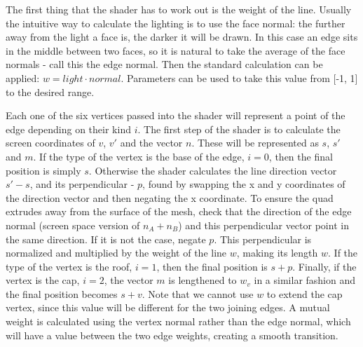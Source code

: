 \documentclass[a4paper, 12pt]{article}
\begin{document}
The first thing that the shader has to work out is the weight of the line. Usually the intuitive way to calculate the lighting is to use the face normal: the further away from the light a face is, the darker it will be drawn. In this case an edge sits in the middle between two faces, so it is natural to take the average of the face normals - call this the edge normal. Then the standard calculation can be applied: $w = light \cdot normal$. Parameters can be used to take this value from [-1, 1] to the desired range.

Each one of the six vertices passed into the shader will represent a point of the edge depending on their kind $i$. The first step of the shader is to calculate the screen coordinates of  $v$, $v'$ and the vector $n$. These will be represented as $s$, $s'$ and $m$. If the type of the vertex is the base of the edge, $i=0$, then the final position is simply $s$. Otherwise the shader calculates the line direction vector $s'-s$, and its perpendicular - $p$, found by swapping the x and y coordinates of the direction vector and then negating the x coordinate. To ensure the quad extrudes away from the surface of the mesh, check that the direction of the edge normal (screen space version of $n_A+n_B$) and this perpendicular vector point in the same direction. If it is not the case, negate $p$. This perpendicular is normalized and multiplied by the weight of the line $w$, making its length $w$. If the type of the vertex is the roof, $i=1$, then the final position is $s+p$. Finally, if the vertex is the cap, $i=2$, the vector $m$ is lengthened to $w_v$ in a similar fashion and the final position becomes $s+v$. Note that we cannot use $w$ to extend the cap vertex, since this value will be different for the two joining edges. A mutual weight is calculated using the vertex normal rather than the edge normal, which will have a value between the two edge weights, creating a smooth transition.
\end{document}
